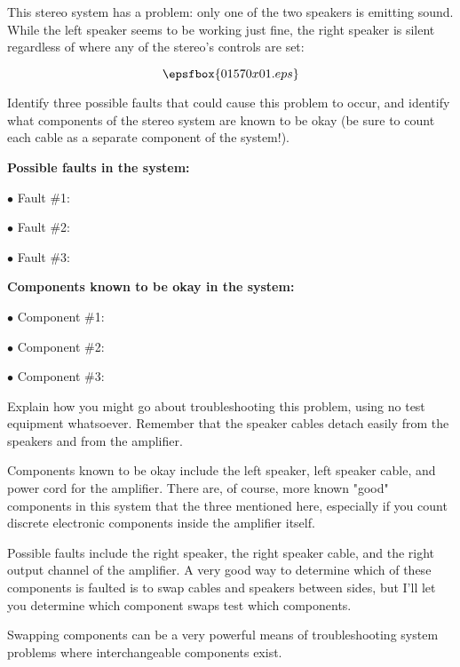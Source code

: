 

This stereo system has a problem: only one of the two speakers is emitting sound.  While the left speaker seems to be working just fine, the right speaker is silent regardless of where any of the stereo's controls are set:

$$\epsfbox{01570x01.eps}$$

Identify three possible faults that could cause this problem to occur, and identify what components of the stereo system are known to be okay (be sure to count each cable as a separate component of the system!).

\goodbreak

\medskip
\item{} {\bf Possible faults in the system:}
\item{$\bullet$} Fault \#1:
\item{$\bullet$} Fault \#2:
\item{$\bullet$} Fault \#3:
\medskip

\vskip 10pt

\medskip
\item{} {\bf Components known to be okay in the system:}
\item{$\bullet$} Component \#1:
\item{$\bullet$} Component \#2:
\item{$\bullet$} Component \#3:
\medskip

Explain how you might go about troubleshooting this problem, using no test equipment whatsoever.  Remember that the speaker cables detach easily from the speakers and from the amplifier.







Components known to be okay include the left speaker, left speaker cable, and power cord for the amplifier.  There are, of course, more known "good" components in this system that the three mentioned here, especially if you count discrete electronic components inside the amplifier itself.

Possible faults include the right speaker, the right speaker cable, and the right output channel of the amplifier.  A very good way to determine which of these components is faulted is to swap cables and speakers between sides, but I'll let you determine which component swaps test which components.







Swapping components can be a very powerful means of troubleshooting system problems where interchangeable components exist.




